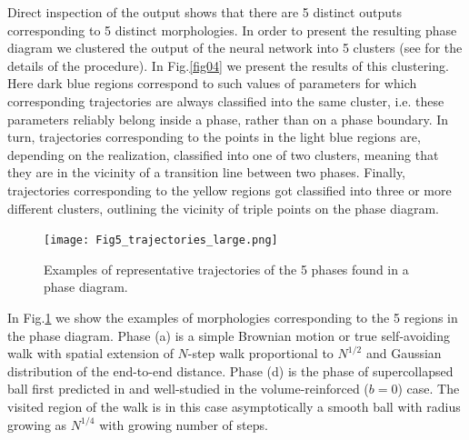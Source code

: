 \documentclass[aps,a4paper,twocolumn,showpacs]{revtex4}
\newcommand{\fig}[1]{Fig.\ref{#1}}
\begin{document}
Direct inspection of the output shows that there are 5 distinct outputs corresponding to 5 distinct morphologies. In order to present the resulting phase diagram we clustered the output of the neural network into 5 clusters (see \cite{supp} for the details of the procedure). In \fig{fig04} we present the results of this clustering. Here dark blue regions correspond to such values of parameters for which corresponding trajectories are always classified into the same cluster, i.e. these parameters reliably belong inside a phase, rather than on a phase boundary. In turn, trajectories corresponding to the points in the light blue regions are, depending on the realization, classified into one of two clusters, meaning that they are in the vicinity of a transition line between two phases. Finally, trajectories corresponding to the yellow regions got classified into three or more different clusters, outlining the vicinity of triple points on the phase diagram. 

\begin{figure}[ht]
\texttt{[image: Fig5\_trajectories\_large.png]}
\caption{Examples of representative trajectories of the 5 phases found in a phase diagram.}
\label{fig05}
\end{figure}

In \fig{fig05} we show the examples of morphologies corresponding to the 5 regions in the phase diagram. Phase (a) is a simple Brownian motion or true self-avoiding walk with spatial extension of $N$-step walk proportional to $N^{1/2}$ and Gaussian distribution of the end-to-end distance. Phase (d) is the phase of supercollapsed ball first predicted in \cite{sapozhnikov} and well-studied in the volume-reinforced ($b=0$) case. The visited region of the walk is in this case asymptotically a smooth ball with radius growing as $N^{1/4}$ with growing number of steps. 
\end{document}
